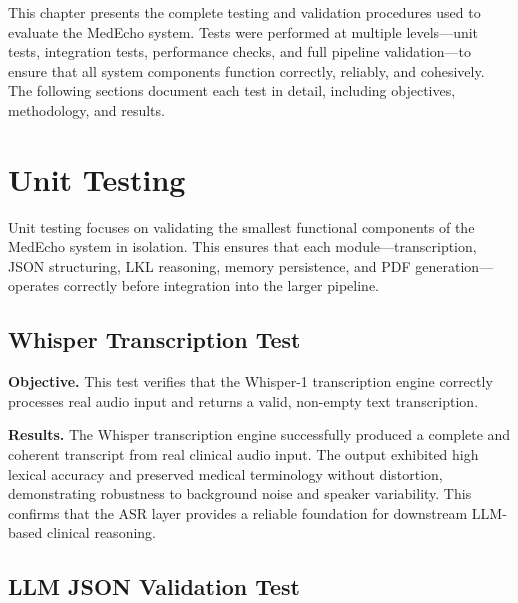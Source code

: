 


This chapter presents the complete testing and validation procedures used to evaluate
the MedEcho system. Tests were performed at multiple levels—unit tests, integration tests,
performance checks, and full pipeline validation—to ensure that all system components
function correctly, reliably, and cohesively. The following sections document each test
in detail, including objectives, methodology, and results.

\section{Unit Testing}
\label{sec:testing:Unit}
Unit testing focuses on validating the smallest functional components of the MedEcho system
in isolation. This ensures that each module—transcription, JSON structuring, LKL reasoning,
memory persistence, and PDF generation—operates correctly before integration into the 
larger pipeline.

\subsection{Whisper Transcription Test}
\label{sec:testing:whisper}

\textbf{Objective.}
This test verifies that the Whisper-1 transcription engine correctly processes real audio
input and returns a valid, non-empty text transcription.

\textbf{Results.}
The Whisper transcription engine successfully produced a complete and coherent transcript
from real clinical audio input. The output exhibited high lexical accuracy and preserved
medical terminology without distortion, demonstrating robustness to background noise and
speaker variability. This confirms that the ASR layer provides a reliable foundation for
downstream LLM-based clinical reasoning.





\subsection{LLM JSON Validation Test}
\label{sec:testing:json}

